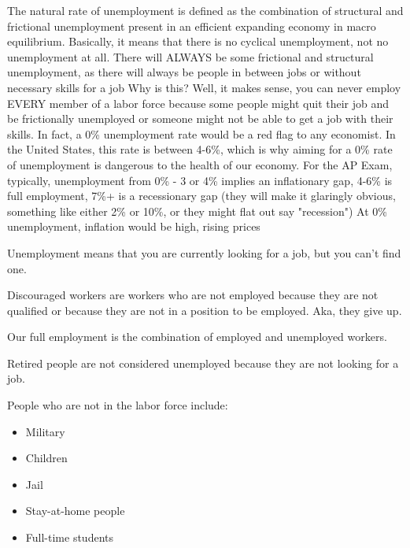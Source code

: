 \documentclass{scrreprt} %
\begin{document}
\begin{remark}

The natural rate of unemployment is defined as the combination of structural and frictional unemployment present in an efficient expanding economy in macro equilibrium.
Basically, it means that there is no cyclical unemployment, not no unemployment at all. There will ALWAYS be some frictional and structural unemployment, as there will always be people in between jobs or without necessary skills for a job
Why is this? Well, it makes sense, you can never employ EVERY member of a labor force because some people might quit their job and be frictionally unemployed or someone might not be able to get a job with their skills. In fact, a 0\% unemployment rate would be a red flag to any economist.
In the United States, this rate is between 4-6\%, which is why aiming for a 0\% rate of unemployment is dangerous to the health of our economy.
For the AP Exam, typically, unemployment from 0\% - 3 or 4\% implies an inflationary gap, 4-6\% is full employment, 7\%+ is a recessionary gap (they will make it glaringly obvious, something like either 2\% or 10\%, or they might flat out say "recession")
At 0\% unemployment, inflation would be high, rising prices

\end{remark}

\begin{definition}
	Unemployment means that you are currently looking for a job, but you can't find one.
\end{definition}

\begin{definition}
	Discouraged workers are workers who are not employed because they are not
	qualified or because they are not in a position to be employed. Aka,
	they give up.
\end{definition}

\begin{definition}
	Our full employment is the combination of employed and unemployed workers.
\end{definition}

\begin{remark}
	Retired people are not considered unemployed because they are not looking for a job.
\end{remark}

People who are not in the labor force include:

\begin{itemize}
	\item Military
	\item Children
	\item Jail
	\item Stay-at-home people
	\item Full-time students
\end{itemize}
\end{document}
